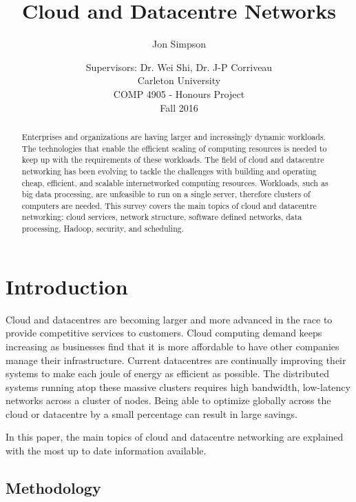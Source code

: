 \documentclass[12pt]{article}
\title{Cloud and Datacentre Networks}
\author{Jon Simpson}
\date{
\small{Supervisors: Dr. Wei Shi, Dr. J-P Corriveau\\
Carleton University\\
COMP 4905 - Honours Project\\
Fall 2016}}
\begin{document}

\maketitle
\thispagestyle{empty}

\begin{abstract}
    Enterprises and organizations are having larger and increasingly dynamic workloads. The technologies that enable the efficient scaling of computing resources is needed to keep up with the requirements of these workloads. The field of cloud and datacentre networking has been evolving to tackle the challenges with building and operating cheap, efficient, and scalable internetworked computing resources. Workloads, such as big data processing, are unfeasible to run on a single server, therefore clusters of computers are needed. This survey covers the main topics of cloud and datacentre networking: cloud services, network structure, software defined networks, data processing, Hadoop, security, and scheduling.
\end{abstract}
\newpage

\tableofcontents
\newpage



\section{Introduction} \label{sec:introduction}

Cloud and datacentres are becoming larger and more advanced in the race to provide competitive services to customers. Cloud computing demand keeps increasing as businesses find that it is more affordable to have other companies manage their infrastructure. Current datacentres are continually improving their systems to make each joule of energy as efficient as possible. The distributed systems running atop these massive clusters requires high bandwidth, low-latency networks across a cluster of nodes. Being able to optimize globally across the cloud or datacentre by a small percentage can result in large savings.

In this paper, the main topics of cloud and datacentre networking are explained with the most up to date information available.


\subsection{Methodology} \label{sub:methodology}
\end{document}
